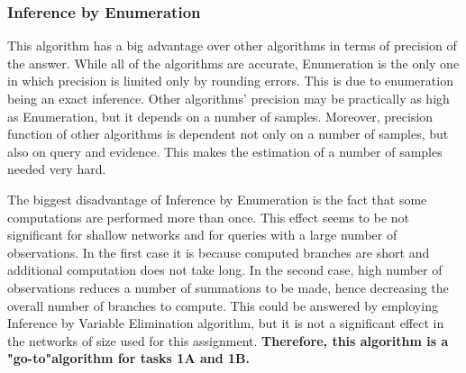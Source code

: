 \documentclass[10pt]{article}
\begin{document}
\subsubsection{Inference by Enumeration}
This algorithm has a big advantage over other algorithms in terms of precision of the answer. While all of the algorithms are accurate, Enumeration is the only one in which precision is limited only by rounding errors. This is due to enumeration being an exact inference. Other algorithms' precision may be practically as high as Enumeration, but it depends on a number of samples. Moreover, precision function of other algorithms is dependent not only on a number of samples, but also on query and evidence. This makes the estimation of a number of samples needed very hard. 

The biggest disadvantage of Inference by Enumeration is the fact that some computations are performed more than once. This effect seems to be not significant for shallow networks and for queries with a large number of observations. In the first case it is because computed branches are short and additional computation does not take long. In the second case, high number of observations reduces a number of summations to be made, hence decreasing the overall number of branches to compute. This could be answered by employing Inference by Variable Elimination algorithm, but it is not a significant effect in the networks of size used for this assignment. \textbf{Therefore, this algorithm is a "go-to"algorithm for tasks 1A and 1B.}
\end{document}
